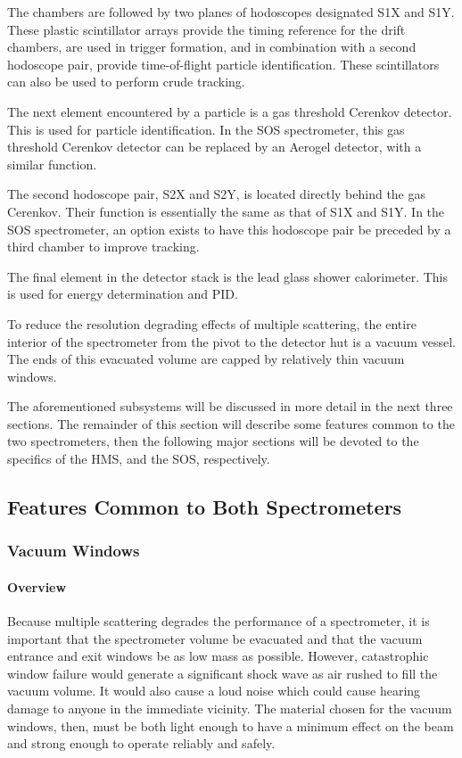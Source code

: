The chambers are followed by two planes of hodoscopes designated S1X and S1Y.
These plastic scintillator arrays provide the timing reference for the
drift chambers, are used in trigger formation, and in combination
with a second hodoscope pair, provide time-of-flight particle identification.
These scintillators can also be used to perform crude tracking.

The next element encountered by a particle is a gas threshold Cerenkov detector.
This is used for particle identification. In the SOS spectrometer, this
gas threshold Cerenkov detector can be replaced by an Aerogel detector,
with a similar function.

The second hodoscope pair, S2X and S2Y, is located directly behind the
gas Cerenkov. Their function is essentially the same as that of S1X and S1Y.
In the SOS spectrometer, an option exists to have this hodoscope pair
be preceded by a third chamber to improve tracking.

The final element in the detector stack is the lead glass shower calorimeter.
This is used for energy determination and PID.
	
To reduce the resolution degrading effects of multiple scattering, the entire
interior of the spectrometer from the pivot to the detector hut is a vacuum
vessel. The ends of this evacuated
volume are capped by relatively thin vacuum windows.

The aforementioned subsystems will be discussed in more detail in the next three
sections. The remainder of this section will describe some features common to
the two spectrometers, then the following major sections will be devoted to the specifics 
of the HMS, and the SOS, respectively.

\subsection{Features Common to Both Spectrometers}

\subsubsection{Vacuum Windows}

\paragraph{Overview}

Because multiple scattering degrades the performance of a spectrometer, it is
important that the spectrometer volume be evacuated and that the vacuum
entrance and exit windows
be as low mass as possible. However,
catastrophic window failure would generate a significant shock wave as air
rushed to fill the vacuum volume. It would also cause a loud noise which
could cause hearing damage to anyone in the immediate vicinity.
The material chosen for the vacuum windows, then, must be both light enough
to have a minimum effect on the beam and
strong enough to operate reliably and safely.

